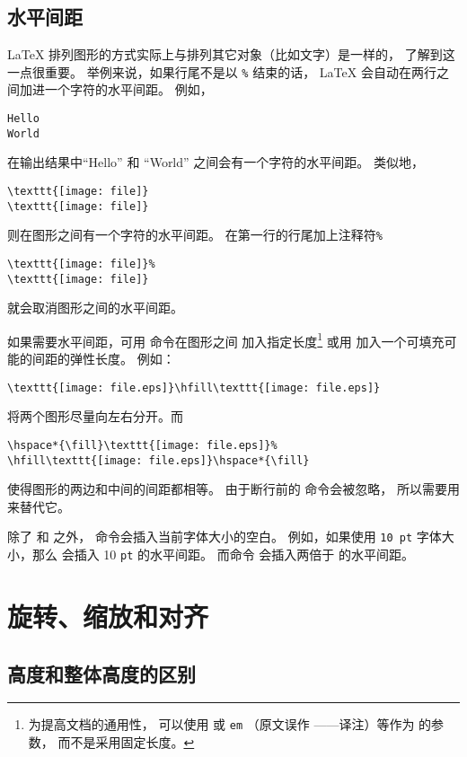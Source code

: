\subsection{水平间距}\label{ssec:hspace}
\LaTeX{} 排列图形的方式实际上与排列其它对象（比如文字）是一样的，
了解到这一点很重要。
举例来说，如果行尾不是以 \texttt{\%} 结束的话，
\LaTeX{} 会自动在两行之间加进一个字符的水平间距。
例如，
\begin{lstlisting}
Hello
World
\end{lstlisting}
在输出结果中``Hello'' 和 ``World'' 之间会有一个字符的水平间距。
类似地，
\begin{lstlisting}
\texttt{[image: file]}
\texttt{[image: file]}
\end{lstlisting}
则在图形之间有一个字符的水平间距。
在第一行的行尾加上注释符\texttt{\%}
\begin{lstlisting}
\texttt{[image: file]}%
\texttt{[image: file]}
\end{lstlisting}
就会取消图形之间的水平间距。

如果需要水平间距，可用  命令在图形之间
加入指定长度\footnote{
    为提高文档的通用性，
	可以使用  或 \texttt{em} （原文误作 ——译注）等作为  的参数，
	而不是采用固定长度。}
或用  加入一个可填充可能的间距的弹性长度。
例如：
\begin{lstlisting}
\texttt{[image: file.eps]}\hfill\texttt{[image: file.eps]}
\end{lstlisting}
将两个图形尽量向左右分开。而
\begin{lstlisting}
\hspace*{\fill}\texttt{[image: file.eps]}%
\hfill\texttt{[image: file.eps]}\hspace*{\fill}
\end{lstlisting}
使得图形的两边和中间的间距都相等。
由于断行前的  命令会被忽略，
所以需要用 来替代它。

除了  和  之外，
 命令会插入当前字体大小的空白。
例如，如果使用 \texttt{10 pt} 字体大小，那么  会插入 10 \texttt{pt} 的水平间距。
而命令  会插入两倍于  的水平间距。


\section{旋转、缩放和对齐}\label{sec:rotate-scale-align}

\subsection{高度和整体高度的区别}\label{ssec:diffheight}

